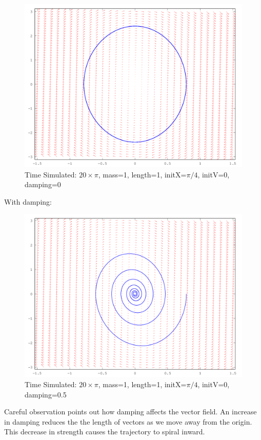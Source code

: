 \documentclass{article}
\begin{document}
\begin{figure}[H]
\caption{Time Simulated: $20\times\pi$, mass=1, length=1, initX=$\pi / 4$, initV=0, damping=0}
\includegraphics[width=\textwidth]{plot7}
\end{figure}

With damping:
\begin{figure}[H]
\caption{Time Simulated: $20\times\pi$, mass=1, length=1, initX=$\pi / 4$, initV=0, damping=0.5}
\includegraphics[width=\textwidth]{plot8}
\end{figure}

Careful observation points out how damping affects the vector field. An increase in damping reduces the the length of vectors as we move away from the origin. This decrease in strength causes the trajectory to spiral inward.
\end{document}
